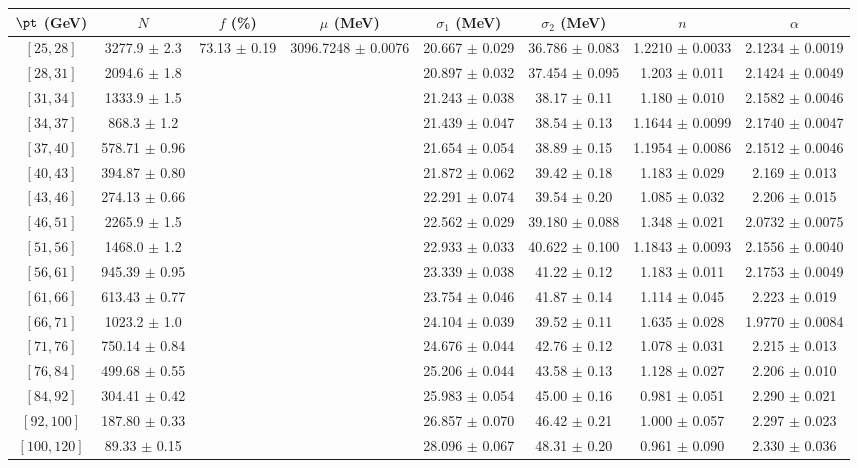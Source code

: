 \begin{tabular}{c||c|c|c|c|c|c|c}
$\pt$ (GeV) & $N$ & $f$ (\%) & $\mu$ (MeV) & $\sigma_1$ (MeV) & $\sigma_2$ (MeV) & $n$ & $\alpha$ \\
\hline
$[25, 28]$ & 3277.9 $\pm$ 2.3 & \multirow{17}{*}{73.13 $\pm$ 0.19} & \multirow{17}{*}{3096.7248 $\pm$ 0.0076} & 20.667 $\pm$ 0.029 & 36.786 $\pm$ 0.083 & 1.2210 $\pm$ 0.0033 & 2.1234 $\pm$ 0.0019\\
$[28, 31]$ & 2094.6 $\pm$ 1.8 &  &  & 20.897 $\pm$ 0.032 & 37.454 $\pm$ 0.095 & 1.203 $\pm$ 0.011 & 2.1424 $\pm$ 0.0049\\
$[31, 34]$ & 1333.9 $\pm$ 1.5 &  &  & 21.243 $\pm$ 0.038 & 38.17 $\pm$ 0.11 & 1.180 $\pm$ 0.010 & 2.1582 $\pm$ 0.0046\\
$[34, 37]$ & 868.3 $\pm$ 1.2 &  &  & 21.439 $\pm$ 0.047 & 38.54 $\pm$ 0.13 & 1.1644 $\pm$ 0.0099 & 2.1740 $\pm$ 0.0047\\
$[37, 40]$ & 578.71 $\pm$ 0.96 &  &  & 21.654 $\pm$ 0.054 & 38.89 $\pm$ 0.15 & 1.1954 $\pm$ 0.0086 & 2.1512 $\pm$ 0.0046\\
$[40, 43]$ & 394.87 $\pm$ 0.80 &  &  & 21.872 $\pm$ 0.062 & 39.42 $\pm$ 0.18 & 1.183 $\pm$ 0.029 & 2.169 $\pm$ 0.013\\
$[43, 46]$ & 274.13 $\pm$ 0.66 &  &  & 22.291 $\pm$ 0.074 & 39.54 $\pm$ 0.20 & 1.085 $\pm$ 0.032 & 2.206 $\pm$ 0.015\\
$[46, 51]$ & 2265.9 $\pm$ 1.5 &  &  & 22.562 $\pm$ 0.029 & 39.180 $\pm$ 0.088 & 1.348 $\pm$ 0.021 & 2.0732 $\pm$ 0.0075\\
$[51, 56]$ & 1468.0 $\pm$ 1.2 &  &  & 22.933 $\pm$ 0.033 & 40.622 $\pm$ 0.100 & 1.1843 $\pm$ 0.0093 & 2.1556 $\pm$ 0.0040\\
$[56, 61]$ & 945.39 $\pm$ 0.95 &  &  & 23.339 $\pm$ 0.038 & 41.22 $\pm$ 0.12 & 1.183 $\pm$ 0.011 & 2.1753 $\pm$ 0.0049\\
$[61, 66]$ & 613.43 $\pm$ 0.77 &  &  & 23.754 $\pm$ 0.046 & 41.87 $\pm$ 0.14 & 1.114 $\pm$ 0.045 & 2.223 $\pm$ 0.019\\
$[66, 71]$ & 1023.2 $\pm$ 1.0 &  &  & 24.104 $\pm$ 0.039 & 39.52 $\pm$ 0.11 & 1.635 $\pm$ 0.028 & 1.9770 $\pm$ 0.0084\\
$[71, 76]$ & 750.14 $\pm$ 0.84 &  &  & 24.676 $\pm$ 0.044 & 42.76 $\pm$ 0.12 & 1.078 $\pm$ 0.031 & 2.215 $\pm$ 0.013\\
$[76, 84]$ & 499.68 $\pm$ 0.55 &  &  & 25.206 $\pm$ 0.044 & 43.58 $\pm$ 0.13 & 1.128 $\pm$ 0.027 & 2.206 $\pm$ 0.010\\
$[84, 92]$ & 304.41 $\pm$ 0.42 &  &  & 25.983 $\pm$ 0.054 & 45.00 $\pm$ 0.16 & 0.981 $\pm$ 0.051 & 2.290 $\pm$ 0.021\\
$[92, 100]$ & 187.80 $\pm$ 0.33 &  &  & 26.857 $\pm$ 0.070 & 46.42 $\pm$ 0.21 & 1.000 $\pm$ 0.057 & 2.297 $\pm$ 0.023\\
$[100, 120]$ & 89.33 $\pm$ 0.15 &  &  & 28.096 $\pm$ 0.067 & 48.31 $\pm$ 0.20 & 0.961 $\pm$ 0.090 & 2.330 $\pm$ 0.036\\
\end{tabular}
